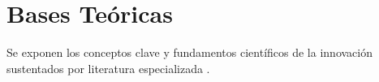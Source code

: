 \section{Bases Teóricas}
Se exponen los conceptos clave y fundamentos científicos de la innovación sustentados por literatura especializada \parencite{knuth1984literate, lamport1994latex}.
